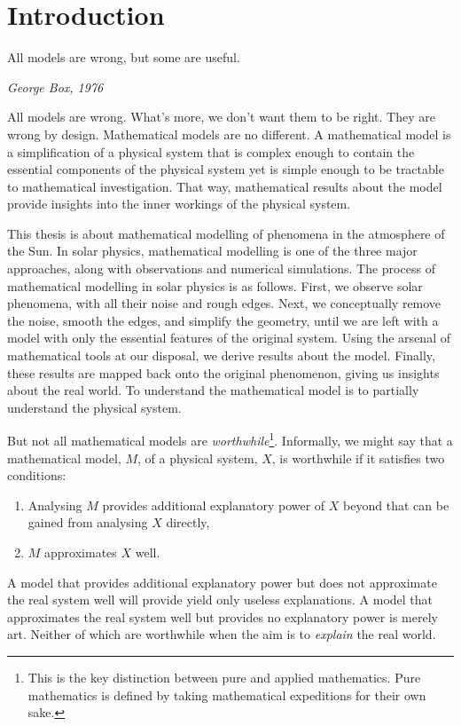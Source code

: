 
\chapter{Introduction}
\label{chap:intro}

\epigraph{All models are wrong, but some are useful.}{\textit{George Box, 1976}}

All models are wrong. What's more, we don't want them to be right. They are wrong by design. Mathematical models are no different. A mathematical model is a simplification of a physical system that is complex enough to contain the essential components of the physical system yet is simple enough to be tractable to mathematical investigation. That way, mathematical results about the model provide insights into the inner workings of the physical system.

This thesis is about mathematical modelling of phenomena in the atmosphere of the Sun. In solar physics, mathematical modelling is one of the three major approaches, along with observations and numerical simulations. The process of mathematical modelling in solar physics is as follows. First, we observe solar phenomena, with all their noise and rough edges. Next, we conceptually remove the noise, smooth the edges, and simplify the geometry, until we are left with a model with only the essential features of the original system. Using the arsenal of mathematical tools at our disposal, we derive results about the model. Finally, these results are mapped back onto the original phenomenon, giving us insights about the real world. To understand the mathematical model is to partially understand the physical system.

But not all mathematical models are \textit{worthwhile}\footnote{This is the key distinction between pure and applied mathematics. Pure mathematics is defined by taking mathematical expeditions for their own sake.}. Informally, we might say that a mathematical model, $M$, of a physical system, $X$, is worthwhile if it satisfies two conditions:
\begin{enumerate}
	\item Analysing $M$ provides additional explanatory power of $X$ beyond that can be gained from analysing $X$ directly,
	\item $M$ approximates $X$ well. \label{approx}
\end{enumerate}
A model that provides additional explanatory power but does not approximate the real system well will provide yield only useless explanations. A model that approximates the real system well but provides no explanatory power is merely art. Neither of which are worthwhile when the aim is to \textit{explain} the real world.

